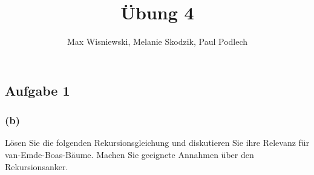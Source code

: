 \documentclass[11pt,a4paper,ngerman]{article}
\date{}
\title{Übung 4}
\author{Max Wisniewski, Melanie Skodzik, Paul Podlech}
\begin{document}

\renewcommand{\figurename}{Grafik}

\maketitle
\thispagestyle{fancy}


\subsection*{Aufgabe 1}



\subsubsection*{(b)}

Lösen Sie die folgenden Rekursionsgleichung und diskutieren Sie ihre Relevanz für van-Emde-Boas-Bäume. Machen Sie geeignete Annahmen über den Rekursionsanker.
\end{document}
